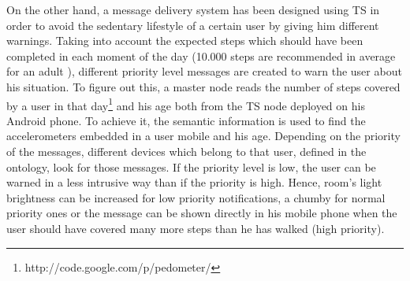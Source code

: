 On the other hand, a message delivery system has been designed using TS in order to avoid the sedentary lifestyle of a certain user by giving him different warnings.
Taking into account the expected steps which should have been completed in each moment of the day (10.000 steps are recommended in average for an adult \citep{tudor2002taking}), different priority level messages are created to warn the user about his situation.
To figure out this, a master node reads the number of steps covered by a user in that day\footnote{http://code.google.com/p/pedometer/} and his age both from the TS node deployed on his Android phone.
To achieve it, the semantic information is used to find the accelerometers embedded in a user mobile and his age. Depending on the priority of the messages, different devices which belong to that user, defined in the ontology, look for those messages.
If the priority level is low, the user can be warned in a less intrusive way than if the priority is high. Hence, room's light brightness can be increased for low priority notifications, a chumby for normal priority ones or the message can be shown directly in his mobile phone when the user should have covered many more steps than he has walked (high priority).